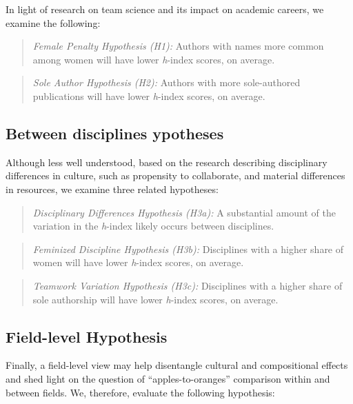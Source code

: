 \documentclass[
  10pt,
  letterpaper,
]{article}
\begin{document}
In light of research on team science and its impact on academic careers,
we examine the following:

\begin{quote}
\emph{Female Penalty Hypothesis (H1):} Authors with names more common
among women will have lower \emph{h}-index scores, on average.
\end{quote}

\begin{quote}
\emph{Sole Author Hypothesis (H2):} Authors with more sole-authored
publications will have lower \emph{h}-index scores, on average.
\end{quote}

\hypertarget{between-disciplines-hypotheses}{%
\subsection{Between disciplines
ypotheses}\label{between-disciplines-hypotheses}}

Although less well understood, based on the research describing
disciplinary differences in culture, such as propensity to collaborate,
and material differences in resources, we examine three related
hypotheses:

\begin{quote}
\emph{Disciplinary Differences Hypothesis (H3a):} A substantial amount
of the variation in the \emph{h}-index likely occurs between
disciplines.
\end{quote}

\begin{quote}
\emph{Feminized Discipline Hypothesis (H3b):} Disciplines with a higher
share of women will have lower \emph{h}-index scores, on average.
\end{quote}

\begin{quote}
\emph{Teamwork Variation Hypothesis (H3c):} Disciplines with a higher
share of sole authorship will have lower \emph{h}-index scores, on
average.
\end{quote}

\hypertarget{field-level-hypothesis}{%
\subsection{Field-level Hypothesis}\label{field-level-hypothesis}}

Finally, a field-level view may help disentangle cultural and
compositional effects and shed light on the question of
``apples-to-oranges'' comparison within and between fields. We,
therefore, evaluate the following hypothesis:
\end{document}
